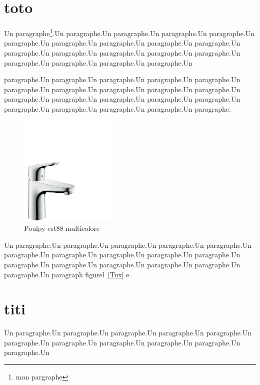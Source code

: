 \documentclass[10pt,twocolumn]{article}
\author{jd}
\begin{document}


\section{toto}

Un paragraphe\footnote{mon pargraphe}.Un paragraphe.Un paragraphe.Un paragraphe.Un paragraphe.Un paragraphe.Un paragraphe.Un paragraphe.Un paragraphe.Un paragraphe.Un paragraphe.Un paragraphe.Un paragraphe.Un paragraphe.Un paragraphe.Un paragraphe.Un paragraphe.Un paragraphe.Un paragraphe.Un \begin{tiny}
paragraphe.Un paragraphe.Un paragraphe.Un paragraphe.Un paragraphe.Un paragraphe.Un paragraphe.Un paragraphe.Un paragraphe.Un paragraphe.Un paragraphe.Un paragraphe.Un paragraphe.Un paragraphe.Un paragraphe.Un paragraphe.Un paragraphe.Un paragraphe.Un paragraphe.Un paragraphe.
\end{tiny}

\begin{figure}[ht]
\begin{center}
\includegraphics[height=200px]{images/mitigeur_hansgrohe.jpg} 
\caption{Poulpy est88 multicolore}

\label{fstsdf} 
\end{center}
\end{figure}


Un paragraphe.Un paragraphe.Un paragraphe.Un paragraphe.Un paragraphe.Un paragraphe.Un paragraphe.Un paragraphe.Un paragraphe.Un paragraphe.Un paragraphe.Un paragraphe.Un paragraphe.Un paragraphe.Un paragraphe.Un paragraphe.Un paragraph figurel~\ref{Tux} e.


\section{titi}
Un paragraphe.Un paragraphe.Un paragraphe.Un paragraphe.Un paragraphe.Un paragraphe.Un paragraphe.Un paragraphe.Un paragraphe.Un paragraphe.Un paragraphe.Un 
\end{document}
